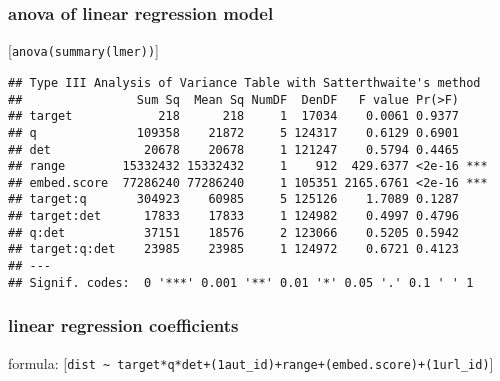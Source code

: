 \documentclass[
  12pt,
  oneside]{book}
\begin{document}
\subsubsection{anova of linear regression model}\label{anova-of-linear-regression-model-4}

{[}\texttt{anova(summary(lmer))}{]}

\begin{verbatim}
## Type III Analysis of Variance Table with Satterthwaite's method
##                Sum Sq  Mean Sq NumDF  DenDF   F value Pr(>F)    
## target            218      218     1  17034    0.0061 0.9377    
## q              109358    21872     5 124317    0.6129 0.6901    
## det             20678    20678     1 121247    0.5794 0.4465    
## range        15332432 15332432     1    912  429.6377 <2e-16 ***
## embed.score  77286240 77286240     1 105351 2165.6761 <2e-16 ***
## target:q       304923    60985     5 125126    1.7089 0.1287    
## target:det      17833    17833     1 124982    0.4997 0.4796    
## q:det           37151    18576     2 123066    0.5205 0.5942    
## target:q:det    23985    23985     1 124972    0.6721 0.4123    
## ---
## Signif. codes:  0 '***' 0.001 '**' 0.01 '*' 0.05 '.' 0.1 ' ' 1
\end{verbatim}

\subsubsection{linear regression coefficients}\label{linear-regression-coefficients-4}

formula: {[}\texttt{dist\ \textasciitilde{}\ target*q*det+(1\textbar{}aut\_id)+range+(embed.score)+(1\textbar{}url\_id)}{]}
\end{document}
